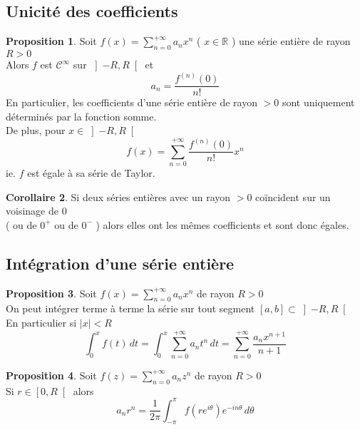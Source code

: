 \documentclass[10pt,a4paper]{article}
\theoremstyle{definition}
\newtheorem{proposition}{Proposition}[section]
\newtheorem{corollary}[proposition]{Corollaire}
\begin{document}
\subsection{Unicité des coefficients}
\begin{proposition}
    Soit \(f(x) = \sum\limits_{n = 0}^{+\infty} a_n x^n\) ( \(x \in \mathbb{R}\) ) une série entière de rayon \(R > 0\) \\
    Alors \(f\) est \(\mathcal{C}^{\infty}\) sur \(\left] -R, R \right[\) et
    \[\boxed{a_n = \frac{f^{(n)}(0)}{n!}}\]
    En particulier, les coefficients d'une série entière de rayon \(> 0\) sont uniquement déterminés par la fonction somme. \\
    De plus, pour \(x \in \left] -R, R \right[\)
    \[\boxed{f(x) = \sum_{n = 0}^{+\infty} \frac{f^{(n)}(0)}{n!}x^n}\]
    ie. \(f\) est égale à sa série de Taylor.
\end{proposition}
\begin{corollary}
    Si deux séries entières avec un rayon \(> 0\) coïncident sur un voisinage de \(0\) \\
    ( ou de \(0^+\) ou de \(0^-\) ) alors elles ont les mêmes coefficients et sont donc égales.
\end{corollary}

\subsection{Intégration d'une série entière}
\begin{proposition}
    Soit \(f(x) = \sum\limits_{n = 0}^{+\infty} a_n x^n\) de rayon \(R > 0\) \\
    On peut intégrer terme à terme la série sur tout segment \([a, b] \subset \left] -R, R \right[\) \\
    En particulier si \(|x| < R\)
    \[\boxed{\int_{0}^{x} f(t) \, dt = \int_{0}^{x} \sum_{n = 0}^{+\infty} a_n t^n \, dt = \sum_{n = 0}^{+\infty} \frac{a_n x^{n + 1}}{n + 1}}\]
\end{proposition}
\begin{proposition}
    Soit \(f(z) = \sum\limits_{n = 0}^{+\infty} a_n z^n\) de rayon \(R > 0\) \\
    Si \(r \in \left[0, R \right[\) alors
    \[\boxed{a_n r^n = \frac{1}{2\pi}\int_{-\pi}^{\pi}f(re^{i\theta})e^{-in\theta} \, d\theta}\]
\end{proposition}

\pagebreak
\end{document}
